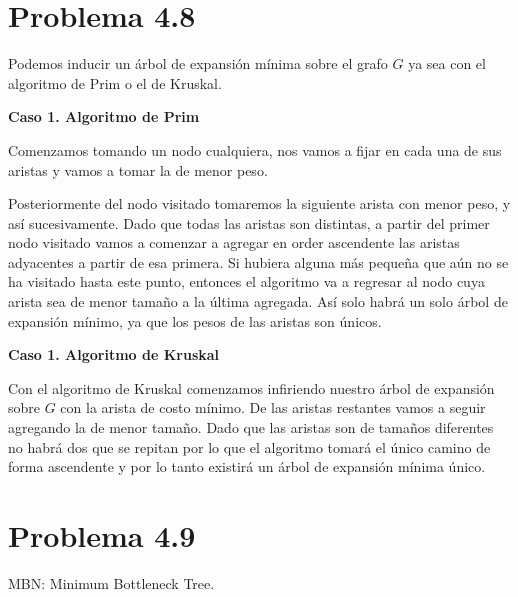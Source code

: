\documentclass{article}
\begin{document}
\section*{Problema 4.8}


Podemos inducir un árbol de expansión mínima sobre el grafo $G$ ya sea con el
algoritmo de Prim o el de Kruskal.

\textbf{Caso 1. Algoritmo de Prim}

Comenzamos tomando un nodo cualquiera, nos vamos a fijar en cada una de sus
aristas y vamos a tomar la de menor peso.

Posteriormente del nodo visitado tomaremos la siguiente arista con menor peso, y
así sucesivamente. Dado que todas las aristas son distintas, a partir del primer
nodo visitado vamos a comenzar a agregar en order ascendente las aristas
adyacentes a partir de esa primera. Si hubiera alguna más pequeña que aún no se
ha visitado hasta este punto, entonces el algoritmo va a regresar al nodo cuya
arista sea de menor tamaño a la última agregada. Así solo habrá un solo árbol de
expansión mínimo, ya que los pesos de las aristas son únicos.

\textbf{Caso 1. Algoritmo de Kruskal}

Con el algoritmo de Kruskal comenzamos infiriendo nuestro árbol de expansión
sobre $G$ con la arista de costo mínimo. De las aristas restantes vamos a seguir
agregando la de menor tamaño. Dado que las aristas son de tamaños diferentes no
habrá dos que se repitan por lo que el algoritmo tomará el único camino de forma
ascendente y por lo tanto existirá un árbol de expansión mínima único.


\section*{Problema 4.9}

% 
% 
MBN: Minimum Bottleneck Tree.
\end{document}
